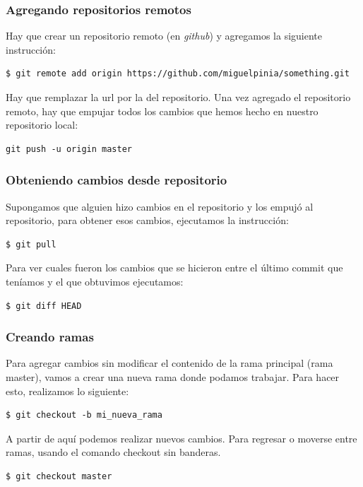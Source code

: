 \documentclass{beamer}
\begin{document}
\begin{frame}[fragile]
  \frametitle{Agregando repositorios remotos}
  Hay que crear un repositorio remoto (en \textit{github}) y agregamos la
  siguiente instrucción:

\begin{verbatim}
$ git remote add origin https://github.com/miguelpinia/something.git
\end{verbatim}

Hay que remplazar la url por la del repositorio. Una vez agregado el repositorio
remoto, hay que empujar todos los cambios que hemos hecho en nuestro repositorio
local:

\begin{verbatim}
git push -u origin master
\end{verbatim}

\end{frame}

\begin{frame}[fragile]
  \frametitle{Obteniendo cambios desde repositorio}

  Supongamos que alguien hizo cambios en el repositorio y los empujó al
repositorio, para obtener esos cambios, ejecutamos la instrucción:

\begin{verbatim}
$ git pull
\end{verbatim}

Para ver cuales fueron los cambios que se hicieron entre el último commit que
teníamos y el que obtuvimos ejecutamos:

\begin{verbatim}
$ git diff HEAD
\end{verbatim}

\end{frame}

\begin{frame}[fragile]
  \frametitle{Creando ramas}
  Para agregar cambios sin modificar el contenido de la rama principal
  (rama master), vamos a crear una nueva rama donde podamos
  trabajar. Para hacer esto, realizamos lo siguiente:

\begin{verbatim}
$ git checkout -b mi_nueva_rama
\end{verbatim}

A partir de aquí podemos realizar nuevos cambios. Para regresar o
moverse entre ramas, usando el comando checkout sin banderas.

\begin{verbatim}
$ git checkout master
\end{verbatim}

\end{frame}
\end{document}
